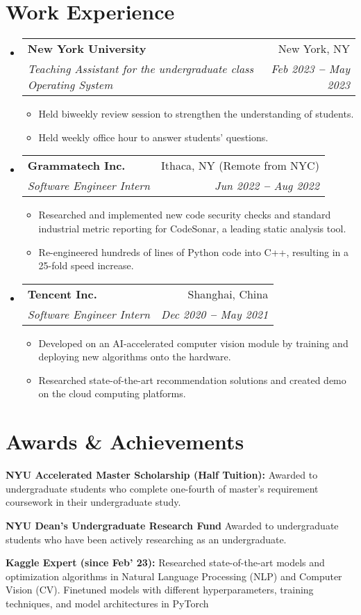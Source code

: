 \documentclass[letterpaper,11pt]{article}
\makeatletter
\newcommand{\resumeItem}[1]{
  \item\small{
    {#1 \vspace{-2pt}}
  }
}
\newcommand{\resumeSubheading}[4]{
  \vspace{-2pt}\item
    \begin{tabular*}{0.97\textwidth}[t]{l@{\extracolsep{\fill}}r}
      \textbf{#1} & #2 \\
      \textit{\small#3} & \textit{\small #4} \\
    \end{tabular*}\vspace{-7pt}
}
\newcommand{\resumeSubHeadingListStart}{\begin{itemize}[leftmargin=0.15in, label={}]}
\newcommand{\resumeSubHeadingListEnd}{\end{itemize}}
\newcommand{\resumeItemListStart}{\begin{itemize}}
\newcommand{\resumeItemListEnd}{\end{itemize}\vspace{-5pt}}
\makeatother
\begin{document}
\section{Work Experience}
  \vspace{3pt}
  \resumeSubHeadingListStart
    \resumeSubheading
      {New York University}{New York, NY}
      {Teaching Assistant for the undergraduate class Operating System}{Feb 2023 \textbf{--} May 2023}
        \resumeItemListStart
            \resumeItem{Held biweekly review session to strengthen the understanding of students.}
            \resumeItem{Held weekly office hour to answer students' questions.}
        \resumeItemListEnd
    \resumeSubheading
      {Grammatech Inc.}{Ithaca, NY (Remote from NYC)}
      {Software Engineer Intern}{Jun 2022 \textbf{--} Aug 2022}
        \resumeItemListStart
            \resumeItem{Researched and implemented new code security checks and standard industrial metric reporting for CodeSonar, a leading static analysis tool.}
            \resumeItem{Re-engineered hundreds of lines of Python code into C++, resulting in a 25-fold speed increase.}
        \resumeItemListEnd
    \resumeSubheading
      {Tencent Inc.}{Shanghai, China}
      {Software Engineer Intern}{Dec 2020 \textbf{--} May 2021}
        \resumeItemListStart
            \resumeItem{Developed on an AI-accelerated computer vision module by training and deploying new algorithms onto the hardware.}
            \resumeItem{Researched state-of-the-art recommendation solutions and created demo on the cloud computing platforms.}
        \resumeItemListEnd
  \resumeSubHeadingListEnd



\section{Awards \& Achievements}
  \vspace{2pt}
  \resumeSubHeadingListStart
    \small{\item{
        \textbf{NYU Accelerated Master Scholarship (Half Tuition):}{ Awarded to undergraduate students who complete one-fourth of master's requirement coursework in their undergraduate study.} \\ \vspace{3pt}
        
        \textbf{NYU Dean's Undergraduate Research Fund}{ Awarded to undergraduate students who have been actively researching as an undergraduate.} \\ \vspace{3pt}

        \textbf{Kaggle Expert (since Feb' 23):}{ Researched state-of-the-art models and optimization algorithms in Natural Language Processing (NLP) and Computer Vision (CV). Finetuned models with different hyperparameters, training techniques, and model architectures in PyTorch} \\ \vspace{3pt}
    }}
  \resumeSubHeadingListEnd
\end{document}
